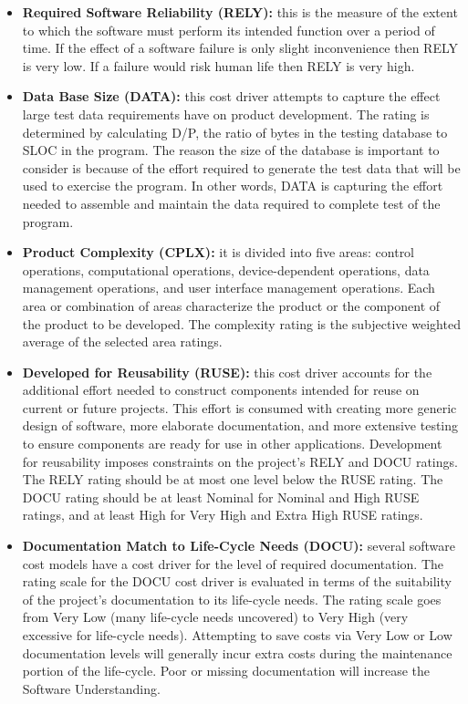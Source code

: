 \begin{itemize}
	
	\item\textbf{Required Software Reliability (RELY):} this is the measure of the extent to which the software must perform its intended function over a period of time. If the effect of a software failure is only slight inconvenience then RELY is very low. If a failure would risk human life then RELY is very high.
	
	\item\textbf{Data Base Size (DATA):} this cost driver attempts to capture the effect large test data requirements have on product development. The rating is determined by calculating D/P, the ratio of bytes in the testing database to SLOC in the program. The reason the size of the database is important to consider is because of the effort required to generate the test data that will be used to exercise the program. In other words, DATA is capturing the effort needed to assemble and maintain the data required to complete test of the program.
	
	\item\textbf{Product Complexity (CPLX):} it is divided into five areas: control operations, computational operations, device-dependent operations, data management operations, and user interface management operations. Each area or combination of areas characterize the product or the component of the product to be developed. The complexity rating is the subjective weighted average of the selected area ratings.
	
	\item\textbf{Developed for Reusability (RUSE):} this cost driver accounts for the additional effort needed to construct components intended for reuse on current or future projects. This effort is consumed with creating more generic design of software, more elaborate documentation, and more extensive testing to ensure components are ready for use in other applications. Development for reusability imposes constraints on the project's RELY and DOCU ratings. The RELY rating should be at most one level below the RUSE rating. The DOCU rating should be at least Nominal for Nominal and High RUSE ratings, and at least High for Very High and Extra High RUSE ratings.
	
	\item\textbf{Documentation Match to Life-Cycle Needs (DOCU):} several software cost models have a cost driver for the level of required documentation. The rating scale for the DOCU cost driver is evaluated in terms of the suitability of the project’s documentation to its life-cycle needs. The rating scale goes from Very Low (many life-cycle needs uncovered) to Very High (very excessive for life-cycle needs). Attempting to save costs via Very Low or Low documentation levels will generally incur extra costs during the maintenance portion of the life-cycle. Poor or missing documentation will increase the Software Understanding.
	

\end{itemize}
